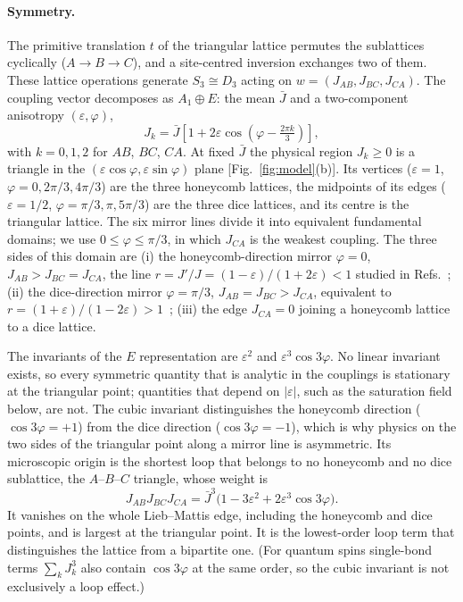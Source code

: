 \documentclass[prb,twocolumn,superscriptaddress,amsmath,amssymb,floatfix]{revtex4-2}
\newcommand{\Jb}{\bar J}
\begin{document}
\paragraph{Symmetry.}
The primitive translation $t$ of the triangular lattice permutes the sublattices cyclically ($A\to B\to C$), and a site-centred inversion exchanges two of them. These lattice operations generate $S_3\cong D_3$ acting on $w=(J_{AB},J_{BC},J_{CA})$. The coupling vector decomposes as $A_1\oplus E$: the mean $\Jb$ and a two-component anisotropy $(\varepsilon,\varphi)$,
\begin{equation}
J_k=\Jb\left[1+2\varepsilon\cos\!\left(\varphi-\tfrac{2\pi k}{3}\right)\right],
\label{eq:Erep}
\end{equation}
with $k=0,1,2$ for $AB$, $BC$, $CA$.
At fixed $\Jb$ the physical region $J_k\ge0$ is a triangle in the $(\varepsilon\cos\varphi,\varepsilon\sin\varphi)$ plane [Fig.~\ref{fig:model}(b)]. Its vertices ($\varepsilon=1$, $\varphi=0,2\pi/3,4\pi/3$) are the three honeycomb lattices, the midpoints of its edges ($\varepsilon=1/2$, $\varphi=\pi/3,\pi,5\pi/3$) are the three dice lattices, and its centre is the triangular lattice. The six mirror lines divide it into equivalent fundamental domains; we use $0\le\varphi\le\pi/3$, in which $J_{CA}$ is the weakest coupling. The three sides of this domain are
(i) the honeycomb-direction mirror $\varphi=0$, $J_{AB}>J_{BC}=J_{CA}$, the line $r=J'/J=(1-\varepsilon)/(1+2\varepsilon)<1$ studied in Refs.~\cite{Gonzalez2019,SeifertVojta2019};
(ii) the dice-direction mirror $\varphi=\pi/3$, $J_{AB}=J_{BC}>J_{CA}$, equivalent to $r=(1+\varepsilon)/(1-2\varepsilon)>1$~\cite{NakanoSakai2017};
(iii) the edge $J_{CA}=0$ joining a honeycomb lattice to a dice lattice.

The invariants of the $E$ representation are $\varepsilon^2$ and $\varepsilon^3\cos3\varphi$. No linear invariant exists, so every symmetric quantity that is analytic in the couplings is stationary at the triangular point; quantities that depend on $|\varepsilon|$, such as the saturation field below, are not. The cubic invariant distinguishes the honeycomb direction ($\cos3\varphi=+1$) from the dice direction ($\cos3\varphi=-1$), which is why physics on the two sides of the triangular point along a mirror line is asymmetric. Its microscopic origin is the shortest loop that belongs to no honeycomb and no dice sublattice, the $A$--$B$--$C$ triangle, whose weight is
\begin{equation}
J_{AB}J_{BC}J_{CA}=\Jb^3\big(1-3\varepsilon^2+2\varepsilon^3\cos3\varphi\big).
\label{eq:loop}
\end{equation}
It vanishes on the whole Lieb--Mattis edge, including the honeycomb and dice points, and is largest at the triangular point. It is the lowest-order loop term that distinguishes the lattice from a bipartite one. (For quantum spins single-bond terms $\sum_kJ_k^3$ also contain $\cos3\varphi$ at the same order, so the cubic invariant is not exclusively a loop effect.)
\end{document}
